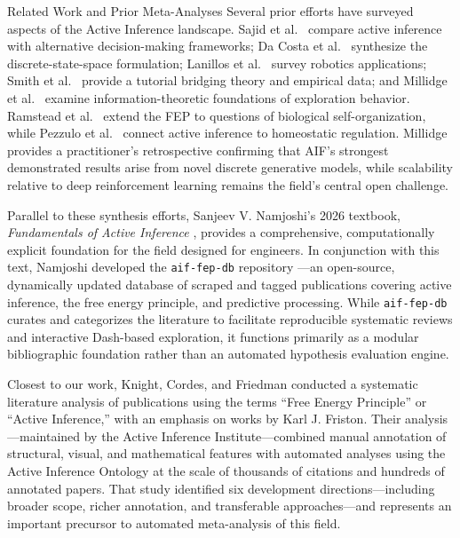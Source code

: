 \documentclass[
  ignorenonframetext,
]{beamer}
\begin{document}
\begin{frame}[fragile]{Related Work and Prior Meta-Analyses}
\protect{}\label{related-work-and-prior-meta-analyses}
Several prior efforts have surveyed aspects of the Active Inference
landscape. Sajid et al.~\citep{sajid2021active} compare active inference
with alternative decision-making frameworks; Da Costa et
al.~\citep{dacosta2020active} synthesize the discrete-state-space
formulation; Lanillos et al.~\citep{lanillos2021active} survey robotics
applications; Smith et al.~\citep{smith2021computational} provide a
tutorial bridging theory and empirical data; and Millidge et
al.~\citep{millidge2021understanding} examine information-theoretic
foundations of exploration behavior. Ramstead et
al.~\citep{ramstead2018answering} extend the FEP to questions of
biological self-organization, while Pezzulo et
al.~\citep{pezzulo2015active} connect active inference to homeostatic
regulation. Millidge \citep{millidge2024retrospective} provides a
practitioner's retrospective confirming that AIF's strongest
demonstrated results arise from novel discrete generative models, while
scalability relative to deep reinforcement learning remains the field's
central open challenge.

Parallel to these synthesis efforts, Sanjeev V. Namjoshi's 2026
textbook, \emph{Fundamentals of Active Inference}
\citep{namjoshi2026fundamentals}, provides a comprehensive,
computationally explicit foundation for the field designed for
engineers. In conjunction with this text, Namjoshi developed the
\texttt{aif-fep-db} repository \citep{namjoshi2026aiffepdb}---an
open-source, dynamically updated database of scraped and tagged
publications covering active inference, the free energy principle, and
predictive processing. While \texttt{aif-fep-db} curates and categorizes
the literature to facilitate reproducible systematic reviews and
interactive Dash-based exploration, it functions primarily as a modular
bibliographic foundation rather than an automated hypothesis evaluation
engine.

Closest to our work, Knight, Cordes, and Friedman \citep{knight2022fep}
conducted a systematic literature analysis of publications using the
terms ``Free Energy Principle'' or ``Active Inference,'' with an
emphasis on works by Karl J. Friston. Their analysis---maintained by the
Active Inference Institute---combined manual annotation of structural,
visual, and mathematical features with automated analyses using the
Active Inference Ontology at the scale of thousands of citations and
hundreds of annotated papers. That study identified six development
directions---including broader scope, richer annotation, and
transferable approaches---and represents an important precursor to
automated meta-analysis of this field.


\end{frame}
\end{document}
